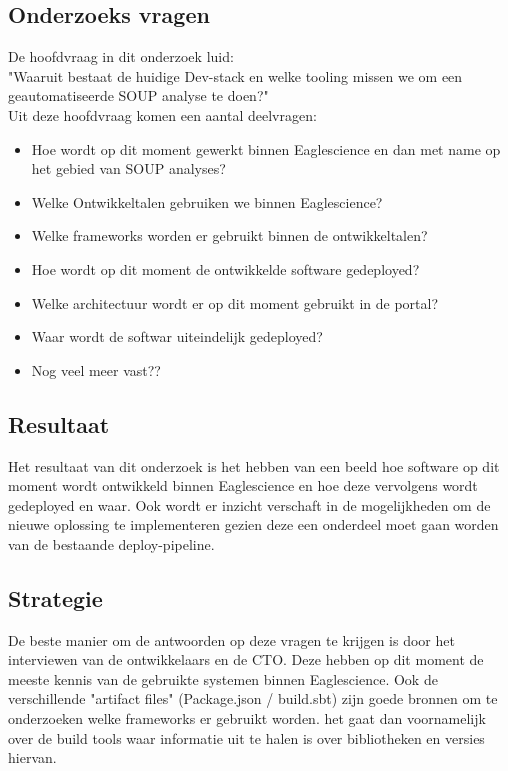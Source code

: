 \subsection{Onderzoeks vragen}
De hoofdvraag in dit onderzoek luid: \\
"Waaruit bestaat de huidige Dev-stack en welke tooling missen we om een geautomatiseerde SOUP analyse te doen?"\\
Uit deze hoofdvraag komen een aantal deelvragen:

\begin{itemize}
  \item Hoe wordt op dit moment gewerkt binnen Eaglescience en dan met name op het gebied van SOUP analyses?
  \item Welke Ontwikkeltalen gebruiken we binnen Eaglescience?
  \item Welke frameworks worden er gebruikt binnen de ontwikkeltalen?
  \item Hoe wordt op dit moment de ontwikkelde software gedeployed?
  \item Welke architectuur wordt er op dit moment gebruikt in de portal?
  \item Waar wordt de softwar uiteindelijk gedeployed?
  \item Nog veel meer vast??
\end{itemize}

\subsection{Resultaat}
Het resultaat van dit onderzoek is het hebben van een beeld hoe software op dit moment wordt ontwikkeld binnen Eaglescience en hoe deze vervolgens wordt gedeployed en waar. Ook wordt er inzicht verschaft in de mogelijkheden om de nieuwe oplossing te implementeren gezien deze een onderdeel moet gaan worden van de bestaande deploy-pipeline.
\subsection{Strategie}
De beste manier om de antwoorden op deze vragen te krijgen is door het interviewen van de ontwikkelaars en de CTO. Deze hebben op dit moment de meeste kennis van de gebruikte systemen binnen Eaglescience. Ook de verschillende "artifact files" (Package.json / build.sbt) zijn goede bronnen om te onderzoeken welke frameworks er gebruikt worden. het gaat dan voornamelijk over de build tools waar informatie uit te halen is over bibliotheken en versies hiervan.

